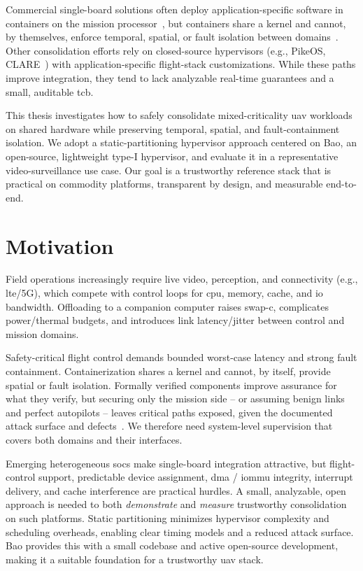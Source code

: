 Commercial single-board solutions often deploy application-specific software
in containers on the mission processor~\cite{skynodeS,auterion-sw-services}, but
containers share a kernel and cannot, by themselves, enforce temporal, spatial,
or fault isolation between domains~\cite{wang_enabling_2018}. Other consolidation
efforts rely on closed-source hypervisors (e.g., PikeOS, CLARE~\cite{cittadini_supporting_2023})
with application-specific flight-stack customizations. While these paths improve
integration, they tend to lack analyzable real-time guarantees and a small,
auditable \gls{tcb}.

This thesis investigates how to safely consolidate mixed-criticality
\gls{uav} workloads on shared hardware while preserving temporal, spatial, and
fault-containment isolation. We adopt a static-partitioning hypervisor approach
centered on Bao, an open-source, lightweight type-I hypervisor, and evaluate it in a
representative video-surveillance use case. Our goal is a trustworthy reference
stack that is practical on commodity platforms, transparent by design, and
measurable end-to-end.

\section{Motivation}
\label{sec:motivation}
Field operations increasingly require live video, perception, and connectivity
(e.g., \gls{lte}/5G), which compete with control loops for \gls{cpu}, memory, cache, and \gls{io}
bandwidth. Offloading to a companion computer raises \gls{swap-c}, complicates
power/thermal budgets, and introduces link latency/jitter between control and
mission domains.

Safety-critical flight control demands bounded worst-case latency and strong
fault containment. Containerization shares a kernel and cannot, by itself,
provide spatial or fault isolation. Formally verified components improve
assurance for what they verify, but securing only the mission side -- or
assuming benign links and perfect autopilots -- leaves critical paths exposed,
given the documented attack surface and
defects~\cite{nassi2021sok,wang_exploratory_2021,buquerin2018security}. We
therefore need system-level supervision that covers both domains and their interfaces.

Emerging heterogeneous \glspl{soc} make single-board integration attractive, but
flight-control support, predictable device assignment, \gls{dma} / \gls{iommu}
integrity, interrupt delivery, and cache interference are practical hurdles. A small, analyzable, open approach is needed to both
\emph{demonstrate} and \emph{measure} trustworthy consolidation on such
platforms.
%
Static partitioning minimizes hypervisor complexity and scheduling overheads,
enabling clear timing models and a reduced attack surface. Bao provides this
with a small codebase and active open-source development, making it a suitable
foundation for a trustworthy \gls{uav} stack.

